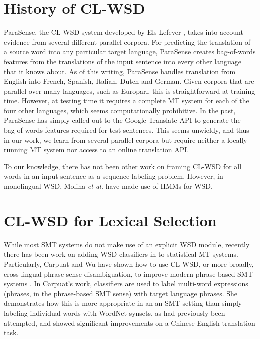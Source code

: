 \section{History of CL-WSD}


ParaSense, the CL-WSD system developed by Els Lefever
\cite{lefever-hoste-decock:2011:ACL-HLT2011}, takes into account evidence from
several different parallel corpora.
For predicting the translation of a source word into
any particular target language, ParaSense creates
bag-of-words features from the translations of the input sentence into every
other language that it knows about. As of this writing, ParaSense handles
translation from English into French, Spanish, Italian, Dutch and German.
Given corpora that are parallel over many languages, such as Europarl, this is
straightforward at
training time. However, at testing time it requires a complete MT system for
each of the four other languages, which seems computationally prohibitive. In
the past, ParaSense has simply called out to the Google Translate API to
generate the bag-of-words features required for test sentences. This seems
unwieldy, and thus in our work, we learn from several parallel corpora but
require neither a locally running MT system nor access to an online translation
API.

To our knowledge, there has not been other work on framing CL-WSD for all words
in an input sentence as a sequence labeling problem. However, in monolingual
WSD, Molina \textit{et al.} \cite{DBLP:conf/iberamia/MolinaPS02} have made
use of HMMs for WSD. 


\section{CL-WSD for Lexical Selection}
While most SMT systems do not make use of an explicit WSD module, recently
there has been work on adding WSD classifiers in to statistical MT systems.
Particularly, Carpuat and Wu have shown how to use CL-WSD, or more broadly,
cross-lingual phrase sense disambiguation, to improve modern phrase-based SMT
systems
\cite{carpuatpsd,carpuat-wu:2007:EMNLP-CoNLL2007,carpuat2008evaluation}. In
Carpuat's work, classifiers are used to label multi-word expressions (phrases,
in the phrase-based SMT sense) with target language phrases. She demonstrates
how this is more appropriate in an an SMT setting than simply labeling
individual words with WordNet synsets, as had previously been attempted, and
showed significant improvements on a Chinese-English translation task.


